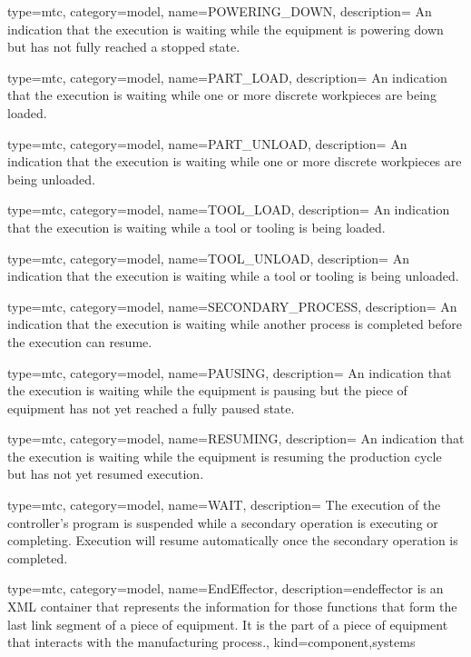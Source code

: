 {
  type=mtc,
  category=model,
  name={POWERING\_DOWN},
  description={ An indication that the execution is waiting while the equipment is powering down but has not fully reached a stopped state.}
}


{
  type=mtc,
  category=model,
  name={PART\_LOAD},
  description={ An indication that the execution is waiting while one or more discrete workpieces are being loaded.}
}


{
  type=mtc,
  category=model,
  name={PART\_UNLOAD},
  description={ An indication that the execution is waiting while one or more discrete workpieces are being unloaded.}
}


{
  type=mtc,
  category=model,
  name={TOOL\_LOAD},
  description={ An indication that the execution is waiting while a tool or tooling is being loaded.}
}


{
  type=mtc,
  category=model,
  name={TOOL\_UNLOAD},
  description={ An indication that the execution is waiting while a tool or tooling is being unloaded.}
}


{
  type=mtc,
  category=model,
  name={SECONDARY\_PROCESS},
  description={ An indication that the execution is waiting while another process is completed before the execution can resume.}
}


{
  type=mtc,
  category=model,
  name={PAUSING},
  description={ An indication that the execution is waiting while the equipment is pausing but the piece of equipment has not yet reached a fully paused state.}
}


{
  type=mtc,
  category=model,
  name={RESUMING},
  description={ An indication that the execution is waiting while the equipment is resuming the production cycle but has not yet resumed execution.}
}


{
  type=mtc,
  category=model,
  name={WAIT},
  description={  The execution of the controller's program is suspended while a secondary operation is executing or completing.  Execution will resume automatically once the secondary operation is completed.}
}


{
  type=mtc,
  category=model,
  name={EndEffector},
  description={\gls{endeffector} is an XML container that represents the information for those functions that form the last link segment of a piece of equipment. It is the part of a piece of equipment that interacts with the manufacturing process.},
  kind={component,systems}
}


